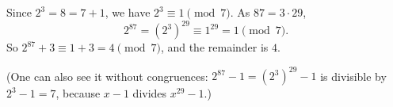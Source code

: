 Since $2^3=8=7+1$, we have $2^3\equiv1\pmod 7$. As $87=3\cdot29$,
\[
2^{87}=\left(2^3\right)^{29}\equiv1^{29}=1\pmod 7 .
\]
So $2^{87}+3\equiv1+3=4\pmod7$, and the remainder is $\boxed{4}$.

(One can also see it without congruences: $2^{87}-1=\left(2^3\right)^{29}-1$ is divisible by $2^3-1=7$, because $x-1$ divides $x^{29}-1$.)
